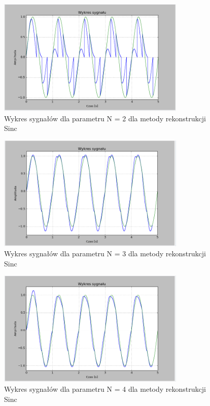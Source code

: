 \documentclass{article}
\begin{document}
    \begin{figure}[h!]
        \centering
        \includegraphics[width=0.8\textwidth]{img/1/sinc2.png}
        \caption{Wykres sygnałów dla parametru N = 2 dla metody rekonstrukcji Sinc}
    \end{figure}
    \FloatBarrier

    \begin{figure}[h!]
        \centering
        \includegraphics[width=0.8\textwidth]{img/1/sinc_3.png}
        \caption{Wykres sygnałów dla parametru N = 3 dla metody rekonstrukcji Sinc}
    \end{figure}
    \FloatBarrier

    \begin{figure}[h!]
        \centering
        \includegraphics[width=0.8\textwidth]{img/1/sinc4.png}
        \caption{Wykres sygnałów dla parametru N = 4 dla metody rekonstrukcji Sinc}
    \end{figure}
    \FloatBarrier
\end{document}
